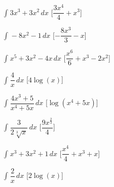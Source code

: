 \begin{esercizio}
\begin{multicols}{2}
\begin{enumeratea}
\item \(\int_{}^{}3 x^{3} + 3 x^{2}\, dx\) 
 \hfill [\(\dfrac{3 x^{4}}{4} + x^{3}\)]
\item \(\int_{}^{}- 8 x^{2} - 1\, dx\) 
 \hfill [\(- \dfrac{8 x^{3}}{3} - x\)]
\item \(\int_{}^{}x^{5} + 3 x^{2} - 4 x\, dx\) 
 \hfill [\(\dfrac{x^{6}}{6} + x^{3} - 2 x^{2}\)]
\item \(\int_{}^{}\dfrac{4}{x}\, dx\) 
 \hfill [\(4 \log{\left (x \right )}\)]
\item \(\int_{}^{}\dfrac{4 x^{3} + 5}{x^{4} + 5 x}\, dx\) 
 \hfill [\(\log{\left (x^{4} + 5 x \right )}\)]
\item \(\int_{}^{}\dfrac{3}{2 \sqrt[3]{x}}\, dx\) 
 \hfill [\(\dfrac{9 x^{\frac{2}{3}}}{4}\)]
\item \(\int_{}^{}x^{3} + 3 x^{2} + 1\, dx\) 
 \hfill [\(\dfrac{x^{4}}{4} + x^{3} + x\)]
\item \(\int_{}^{}\dfrac{2}{x}\, dx\) 
 \hfill [\(2 \log{\left (x \right )}\)]
 \end{enumeratea}
\end{multicols}
\end{esercizio}

